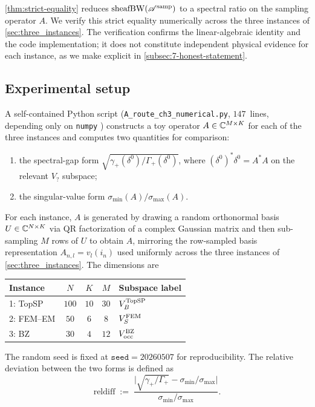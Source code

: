 %

\noindent
\cref{thm:strict-equality} reduces $\operatorname{sheafBW}(\mathscr{A}^{\mathrm{samp}})$ to a spectral
ratio on the sampling operator $A$. We verify this strict equality
numerically across the three instances of \cref{sec:three_instances}.
The verification confirms the linear-algebraic identity and the code
implementation; it does not constitute independent physical evidence
for each instance, as we make explicit in
\cref{subsec:7-honest-statement}.

\subsection{Experimental setup}\label{subsec:7-setup}

A self-contained Python script (\texttt{A\_route\_ch3\_numerical.py},
$147$~lines, depending only on
\texttt{numpy} \cite{HarrisEtAl2020NumPy}) constructs a toy operator
$A \in \mathbb{C}^{M \times K}$ for each of the three instances and computes
two quantities for comparison:
\begin{enumerate}[leftmargin=*,label=(\roman*)]
\item the spectral-gap form
  $\sqrt{\gamma_+(\delta^0)/\Gamma_+(\delta^0)}$, where
  $(\delta^0)^* \delta^0 = A^* A$ on the relevant $V_?$ subspace;
\item the singular-value form
  $\sigma_{\min}(A)/\sigma_{\max}(A)$.
\end{enumerate}
For each instance, $A$ is generated by drawing a random orthonormal
basis $U \in \mathbb{C}^{N \times K}$ via QR factorization of a complex
Gaussian matrix and then sub-sampling $M$ rows of $U$ to obtain
$A$, mirroring the row-sampled basis representation
$A_{n,l} = v_l(i_n)$ used uniformly across the three instances of
\cref{sec:three_instances}. The dimensions are
\begin{center}
\begin{tabular}{lcccl}
\toprule
Instance & $N$ & $K$ & $M$ & Subspace label \\
\midrule
1: TopSP & $100$ & $10$ & $30$ & $V_B^{\mathrm{TopSP}}$ \\
2: FEM--EM & $50$ & $6$ & $8$ & $V_S^{\mathrm{FEM}}$ \\
3: BZ & $30$ & $4$ & $12$ & $V_{\mathrm{occ}}^{\mathrm{BZ}}$ \\
\bottomrule
\end{tabular}
\end{center}
The random seed is fixed at $\mathtt{seed} = 20260507$ for
reproducibility. The relative deviation between the two forms is
defined as
\[
  \mathrm{reldiff}
  \;:=\;
  \frac{\bigl|\sqrt{\gamma_+/\Gamma_+} - \sigma_{\min}/\sigma_{\max}\bigr|}{\sigma_{\min}/\sigma_{\max}}.
\]

